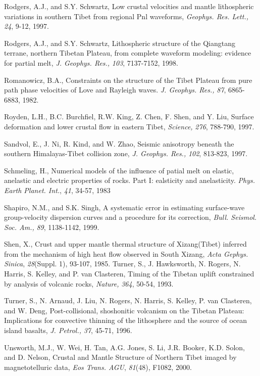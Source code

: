 \documentclass[12pt]{article}
\begin{document}
\begin{references}
Rodgers, A.J., and S.Y. Schwartz, Low crustal velocities and mantle
lithospheric variations in southern Tibet from regional Pnl waveforms,
{\it Geophys. Res. Lett.,} {\it 24}, 9-12, 1997.

Rodgers, A.J., and S.Y. Schwartz, Lithospheric structure of the
Qiangtang terrane, northern Tibetan Plateau, from complete waveform 
modeling: evidence for partial melt, {\it J. Geophys. Res.,} {\it 103}, 
7137-7152, 1998.

Romanowicz, B.A., Constraints on the structure of the Tibet Plateau
from pure path phase velocities of Love and Rayleigh waves. {\it J. Geophys.
Res.,} {\it 87}, 6865-6883, 1982.

Royden, L.H., B.C. Burchfiel, R.W. King, Z. Chen, F. Shen, and Y. Liu,
Surface deformation and lower crustal flow in eastern Tibet, {\it Science,}
{\it 276}, 788-790, 1997.

Sandvol, E., J. Ni, R. Kind, and W. Zhao, Seismic anisotropy
beneath the southern Himalayas-Tibet collision zone, {\it J. Geophys. Res.,}
{\it 102}, 813-823, 1997.

Schmeling, H., Numerical models of the influence of patial melt on
elastic, anelastic and electric properties of rocks. Part I:
ealsticity and anelasticity. {\it Phys. Earth Planet. Int.}, {\it 41}, 
34-57, 1983

Shapiro, N.M., and S.K. Singh, A systematic error in estimating
surface-wave group-velocity dispersion curves and a procedure for its
correction, {\it Bull. Seismol. Soc. Am.,} {\it 89}, 1138-1142, 1999.

Shen, X., Crust and upper mantle thermal structure of Xizang(Tibet)
inferred from the mechanism of high heat flow observed in South
Xizang, {\it Acta Gephys. Sinica}, {\it 28}(Suppl. 1), 93-107, 1985.
Turner, S., J. Hawksworth, N. Rogers, N. Harris, S. Kelley, and P. van 
Clasteren, Timing of the Tibetan uplift constrained
by analysis of volcanic rocks, {\it Nature,} {\it 364}, 50-54, 1993.

Turner, S., N. Arnaud, J. Liu, N. Rogers, N. Harris, S. Kelley, P. van
Clasteren, and W. Deng, Post-collisional, shoshonitic volcanism
on the Tibetan Plateau: Implications for convective thinning of the
lithosphere and the source of ocean island basalts, {\it J. Petrol.,}
{\it 37}, 45-71, 1996.

Unsworth, M.J., W. Wei, H. Tan, A.G. Jones, S. Li, J.R. Booker, K.D. Solon,
and D. Nelson, Crustal and Mantle Structure of Northern Tibet imaged by
magnetotelluric data, {\it Eos Trans. AGU}, {\it 81}(48), F1082, 2000.


\end{references}
\end{document}
